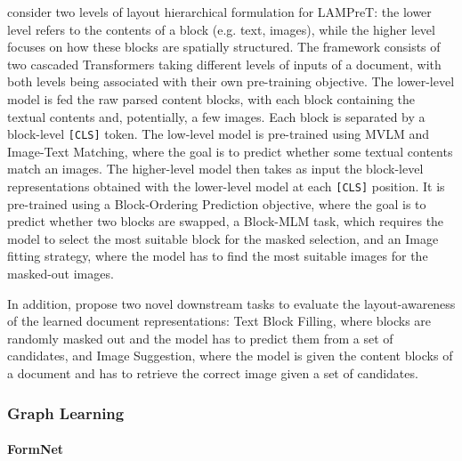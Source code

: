 \citet{wu2021lampret} consider two levels of layout hierarchical formulation for \ac{LAMPreT}: the lower level refers to the contents of a block (e.g. text, images), while the higher level focuses on how these blocks are spatially structured. The framework consists of two cascaded Transformers taking different levels of inputs of a document, with both levels being associated with their own pre-training objective. The lower-level model is fed the raw parsed content blocks, with each block containing the textual contents and, potentially, a few images. Each block is separated by a block-level \texttt{[CLS]} token. The low-level model is pre-trained using \ac{MVLM} and Image-Text Matching, where the goal is to predict whether some textual contents match an images. The higher-level model then takes as input the block-level representations obtained with the lower-level model at each \texttt{[CLS]} position. It is pre-trained using a Block-Ordering Prediction objective, where the goal is to predict whether two blocks are swapped, a Block-MLM task, which requires the model to select the most suitable block for the masked selection, and an Image fitting strategy, where the model has to find the most suitable images for the masked-out images.

In addition, \citet{wu2021lampret} propose two novel downstream tasks to evaluate the layout-awareness of the learned document representations: Text Block Filling, where blocks are randomly masked out and the model has to predict them from a set of candidates, and Image Suggestion, where the model is given the content blocks of a document and has to retrieve the correct image given a set of candidates.



\subsubsection{Graph Learning}

\paragraph{FormNet} 

